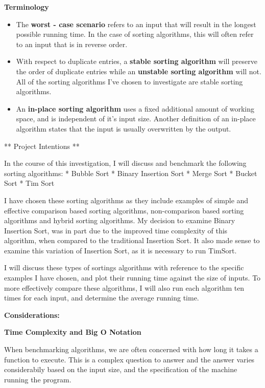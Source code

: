 \documentclass[11pt]{article}
\begin{document}
    \textbf{Terminology}

\begin{itemize}
\item
  The \textbf{worst - case scenario} refers to an input that will result
  in the longest possible running time. In the case of sorting
  algorithms, this will often refer to an input that is in reverse
  order.
\item
  With respect to duplicate entries, a \textbf{stable sorting algorithm}
  will preserve the order of duplicate entries while an \textbf{unstable
  sorting algorithm} will not. All of the sorting algorithms I've chosen
  to investigate are stable sorting algorithms.
\item
  An \textbf{in-place sorting algorithm} uses a fixed additional amount
  of working space, and is independent of it's input size. Another
  definition of an in-place algorithm states that the input is usually
  overwritten by the output.
\end{itemize}

    ** Project Intentions **

In the course of this investigation, I will discuss and benchmark the
following sorting algorithms: * Bubble Sort * Binary Insertion Sort *
Merge Sort * Bucket Sort * Tim Sort

I have chosen these sorting algorithms as they include examples of
simple and effective comparison based sorting algorithms, non-comparison
based sorting algorithms and hybrid sorting algorithms. My decision to
examine Binary Insertion Sort, was in part due to the improved time
complexity of this algorithm, when compared to the traditional Insertion
Sort. It also made sense to examine this variation of Insertion Sort, as
it is necessary to run TimSort.

I will discuss these types of sortings algorithms with reference to the
specific examples I have chosen, and plot their running time against the
size of inputs. To more effectively compare these algorithms, I will
also run each algorithm ten times for each input, and determine the
average running time.

    \textbf{Considerations:}

\textbf{Time Complexity and Big O Notation}

When benchmarking algorithms, we are often concerned with how long it
takes a function to execute. This is a complex question to answer and
the answer varies considerabily based on the input size, and the
specification of the machine running the program.
\end{document}
